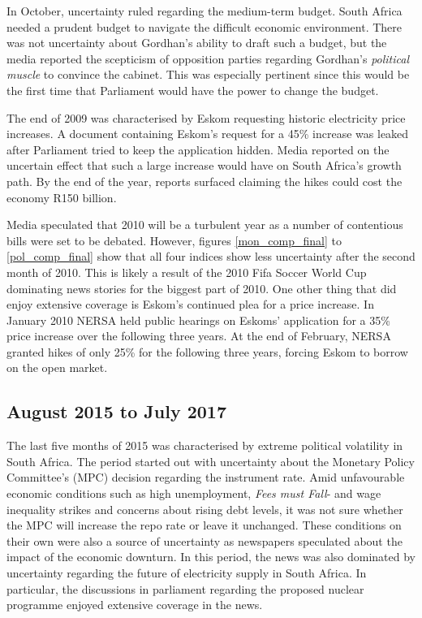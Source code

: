 \documentclass[11pt,preprint, authoryear]{elsarticle}
\numberwithin{equation}{section}
\numberwithin{figure}{section}
\numberwithin{table}{section}
\begin{document}
In October, uncertainty ruled regarding the medium-term budget. South
Africa needed a prudent budget to navigate the difficult economic
environment. There was not uncertainty about Gordhan's ability to draft
such a budget, but the media reported the scepticism of opposition
parties regarding Gordhan's \emph{political muscle} to convince the
cabinet. This was especially pertinent since this would be the first
time that Parliament would have the power to change the budget.

The end of 2009 was characterised by Eskom requesting historic
electricity price increases. A document containing Eskom's request for a
45\% increase was leaked after Parliament tried to keep the application
hidden. Media reported on the uncertain effect that such a large
increase would have on South Africa's growth path. By the end of the
year, reports surfaced claiming the hikes could cost the economy R150
billion.

Media speculated that 2010 will be a turbulent year as a number of
contentious bills were set to be debated. However, figures
\ref{mon_comp_final} to \ref{pol_comp_final} show that all four indices
show less uncertainty after the second month of 2010. This is likely a
result of the 2010 Fifa Soccer World Cup dominating news stories for the
biggest part of 2010. One other thing that did enjoy extensive coverage
is Eskom's continued plea for a price increase. In January 2010 NERSA
held public hearings on Eskoms' application for a 35\% price increase
over the following three years. At the end of February, NERSA granted
hikes of only 25\% for the following three years, forcing Eskom to
borrow on the open market.

\subsection{August 2015 to July 2017}\label{august-2015-to-july-2017}

The last five months of 2015 was characterised by extreme political
volatility in South Africa. The period started out with uncertainty
about the Monetary Policy Committee's (MPC) decision regarding the
instrument rate. Amid unfavourable economic conditions such as high
unemployment, \emph{Fees must Fall}- and wage inequality strikes and
concerns about rising debt levels, it was not sure whether the MPC will
increase the repo rate or leave it unchanged. These conditions on their
own were also a source of uncertainty as newspapers speculated about the
impact of the economic downturn. In this period, the news was also
dominated by uncertainty regarding the future of electricity supply in
South Africa. In particular, the discussions in parliament regarding the
proposed nuclear programme enjoyed extensive coverage in the news.
\end{document}

